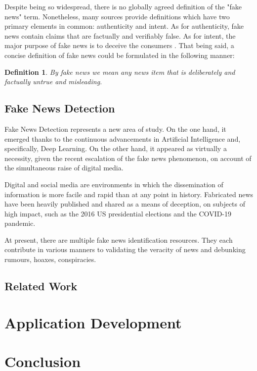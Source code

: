 \documentclass[12pt, a4paper]{article}
\newtheorem{definition}{Definition}
\begin{document}
  Despite being so widespread, there is no globally agreed definition of the "fake news" term. Nonetheless, many sources provide definitions which have two primary elements in common: authenticity and intent. As for authenticity, fake news contain claims that are factually and verifiably false. As for intent, the major purpose of fake news is to deceive the consumers \cite{a2}. That being said, a concise definition of fake news could be formulated in the following manner:

  \begin{definition}
    By fake news we mean any news item that is deliberately and factually untrue and misleading.
  \end{definition}

  \subsection{Fake News Detection}
  Fake News Detection represents a new area of study. On the one hand, it emerged thanks to the continuous advancements in Artificial Intelligence and, specifically, Deep Learning. On the other hand, it appeared as virtually a necessity, given the recent escalation of the fake news phenomenon, on account of the simultaneous raise of digital media.

  Digital and social media are environments in which the dissemination of information is more facile and rapid than at any point in history. Fabricated news have been heavily published and shared as a means of deception, on subjects of high impact, such as the 2016 US presidential elections and the COVID-19 pandemic.

  At present, there are multiple fake news identification resources. They each contribute in various manners to validating the veracity of news and debunking rumours, hoaxes, conspiracies.


  \subsection{Related Work}
  \newpage


  \section{Application Development}
  
  \section{Conclusion}
  \newpage

  
  
  \nocite{*}
\end{document}
